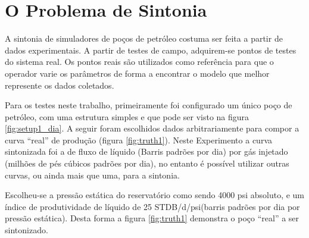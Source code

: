 
\chapter{O Problema de Sintonia} \label{chap:conc}
	

A sintonia de simuladores de poços de petróleo costuma ser feita a partir de dados experimentais. 
%
A partir de testes de campo, adquirem-se pontos de testes do sistema real.
%
Os pontos reais são utilizados como referência para que o operador varie os parâmetros de forma a encontrar o modelo que melhor represente os dados coletados.
%

Para os testes neste trabalho, primeiramente foi configurado um único poço de petróleo, com uma estrutura simples e que pode ser visto na figura \ref{fig:setup1_dia}.
% 
A seguir foram escolhidos dados arbitrariamente para compor a curva ``real'' de produção (figura \ref{fig:truth1}).
%
Neste Experimento a curva sintonizada foi a de fluxo de líquido (Barris padrões por dia) por gás injetado (milhões de pés cúbicos padrões por dia), no entanto é possível utilizar outras curvas, ou ainda mais que uma, para a sintonia.
%

Escolheu-se a pressão estática do reservatório como sendo 4000 psi absoluto, e um índice de produtividade de líquido de 25 STDB/d/psi(barris padrões por dia por pressão estática). 
%
Desta forma a figura \ref{fig:truth1} demonstra o poço ``real'' a ser sintonizado.



